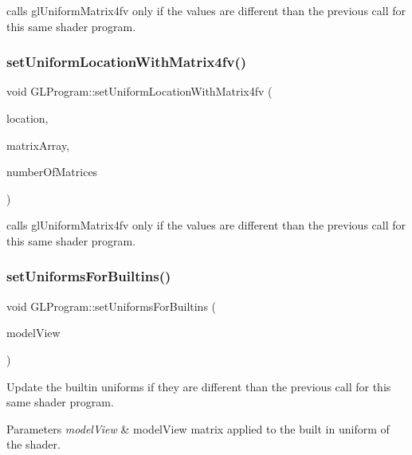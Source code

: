 calls gl\+Uniform\+Matrix4fv only if the values are different than the previous call for this same shader program. \mbox{\label{classGLProgram_a3b6a91383721692fe73f316454325fd7}} 
\subsubsection{\texorpdfstring{set\+Uniform\+Location\+With\+Matrix4fv()}{setUniformLocationWithMatrix4fv()}\hspace{0.1cm}{\footnotesize\ttfamily [2/2]}}
{\footnotesize\ttfamily void G\+L\+Program\+::set\+Uniform\+Location\+With\+Matrix4fv (\begin{DoxyParamCaption}\item[{G\+Lint}]{location,  }\item[{const G\+Lfloat $\ast$}]{matrix\+Array,  }\item[{unsigned int}]{number\+Of\+Matrices }\end{DoxyParamCaption})}

calls gl\+Uniform\+Matrix4fv only if the values are different than the previous call for this same shader program. \mbox{\label{classGLProgram_a62b6c142c96d7286e5d465e0163947ba}} 
\subsubsection{\texorpdfstring{set\+Uniforms\+For\+Builtins()}{setUniformsForBuiltins()}\hspace{0.1cm}{\footnotesize\ttfamily [1/4]}}
{\footnotesize\ttfamily void G\+L\+Program\+::set\+Uniforms\+For\+Builtins (\begin{DoxyParamCaption}\item[{const \hyperlink{classMat4}{Mat4} \&}]{model\+View }\end{DoxyParamCaption})}

Update the builtin uniforms if they are different than the previous call for this same shader program. 
\begin{DoxyParams}{Parameters}
{\em model\+View} & model\+View matrix applied to the built in uniform of the shader. \\
\hline
\end{DoxyParams}
\mbox{\label{classGLProgram_af8f90606d2bffb6418a67195cb9ddc7d}} 
